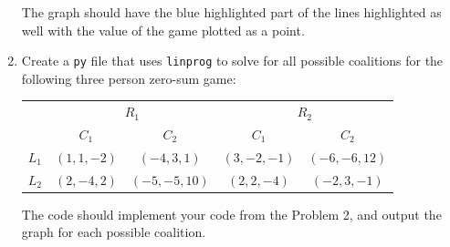 \documentclass[10pt]{article}
\begin{document}
\begin{enumerate}[{$\qquad 1.]
The graph should have the blue highlighted part of the lines highlighted as well with the value of the game plotted as a point.  

\item Create a \texttt{py} file that uses \texttt{linprog} to solve for all possible coalitions for the following three person zero-sum game: 

\begin{center}
\hspace{-2cm}
\def\arraystretch{2}%
\begin{tabular}{l  c c || c c |}
& \multicolumn{2}{c}{{\underline{$R_1$}}} & \multicolumn{2}{c}{{\underline{$R_2$}}}   \\
& $C_1$ & $C_2$ & $C_1$ & $C_2$   \\ \hline
$L_1$ & $(1,1,-2)$ &  $(-4,3,1)$  &  $(3,-2,-1)$  &  $(-6,-6,12)$   \\
$L_2$ & $(2,-4,2)$ &  $(-5,-5,10)$  &  $(2,2,-4)$  &  $(-2,3,-1)$ \\\hline
\end{tabular}
\end{center}\vspace{.5cm}

The code should implement your code from the Problem 2, and output the graph for each possible coalition. 

\end{enumerate}
\end{document}
